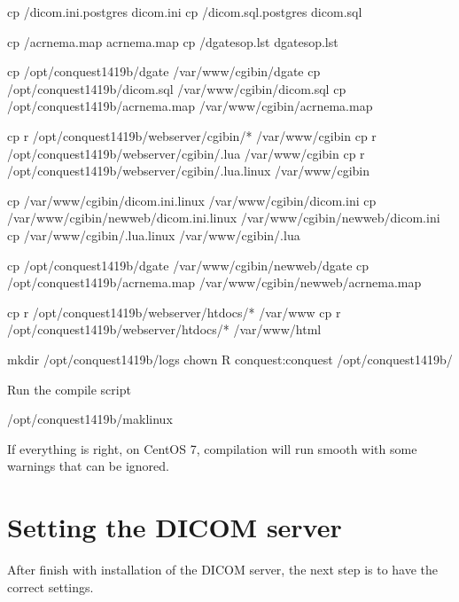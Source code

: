 \documentclass[letterpaper,10pt,english]{sphinxmanual}
\begin{document}
\begin{sphinxVerbatim}[commandchars=\\\{\}]
cp /dicom.ini.postgres dicom.ini
cp /dicom.sql.postgres dicom.sql

cp /acrnema.map acrnema.map
cp /dgatesop.lst dgatesop.lst

cp /opt/conquest\PYGZhy{}14\PYGZhy{}19b/dgate /var/www/cgi\PYGZhy{}bin/dgate 
cp /opt/conquest\PYGZhy{}14\PYGZhy{}19b/dicom.sql /var/www/cgi\PYGZhy{}bin/dicom.sql 
cp /opt/conquest\PYGZhy{}14\PYGZhy{}19b/acrnema.map /var/www/cgi\PYGZhy{}bin/acrnema.map 

cp \PYGZhy{}r /opt/conquest\PYGZhy{}14\PYGZhy{}19b/webserver/cgi\PYGZhy{}bin/* /var/www/cgi\PYGZhy{}bin
cp \PYGZhy{}r /opt/conquest\PYGZhy{}14\PYGZhy{}19b/webserver/cgi\PYGZhy{}bin/.lua /var/www/cgi\PYGZhy{}bin
cp \PYGZhy{}r /opt/conquest\PYGZhy{}14\PYGZhy{}19b/webserver/cgi\PYGZhy{}bin/.lua.linux /var/www/cgi\PYGZhy{}bin

cp /var/www/cgi\PYGZhy{}bin/dicom.ini.linux /var/www/cgi\PYGZhy{}bin/dicom.ini
cp /var/www/cgi\PYGZhy{}bin/newweb/dicom.ini.linux /var/www/cgi\PYGZhy{}bin/newweb/dicom.ini
cp /var/www/cgi\PYGZhy{}bin/.lua.linux /var/www/cgi\PYGZhy{}bin/.lua

cp /opt/conquest\PYGZhy{}14\PYGZhy{}19b/dgate /var/www/cgi\PYGZhy{}bin/newweb/dgate 
cp /opt/conquest\PYGZhy{}14\PYGZhy{}19b/acrnema.map /var/www/cgi\PYGZhy{}bin/newweb/acrnema.map 

cp \PYGZhy{}r /opt/conquest\PYGZhy{}14\PYGZhy{}19b/webserver/htdocs/* /var/www
cp \PYGZhy{}r /opt/conquest\PYGZhy{}14\PYGZhy{}19b/webserver/htdocs/* /var/www/html

mkdir /opt/conquest\PYGZhy{}14\PYGZhy{}19b/logs
chown \PYGZhy{}R conquest:conquest /opt/conquest\PYGZhy{}14\PYGZhy{}19b/
\end{sphinxVerbatim}

Run the compile script

%
\begin{sphinxVerbatim}[commandchars=\\\{\}]
/opt/conquest\PYGZhy{}14\PYGZhy{}19b/maklinux
\end{sphinxVerbatim}

If everything is right, on CentOS 7, compilation will run smooth with some warnings that can be ignored.


\section{Setting the DICOM server}
\label{\detokenize{trl2:setting-the-dicom-server}}
After finish with installation of the DICOM server, the next step is to have the correct settings.
\end{document}
